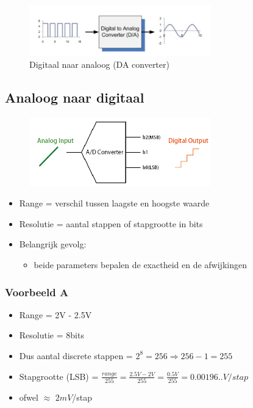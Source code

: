 \documentclass{article}
\begin{document}
\begin{figure}[H]
    \centering
    \includegraphics[width=0.7\textwidth]{Screenshot_20200224_115212.png}
    \caption{Digitaal naar analoog (DA converter)}
\end{figure}

\subsection{Analoog naar digitaal}

\begin{figure}[H]
    \centering
    \includegraphics[width=0.7\textwidth]{Screenshot_20200224_115430.jpg}
    \caption{}
\end{figure}

\begin{itemize}
    \item Range = verschil tussen laagste en hoogste waarde
    \item Resolutie = aantal stappen of stapgrootte in bits
    \item Belangrijk gevolg:
    \begin{itemize}
        \item beide parameters bepalen de exactheid en de afwijkingen
    \end{itemize}
\end{itemize}

\subsubsection{Voorbeeld A}
\begin{itemize}
    \item Range = 2V - 2.5V
    \item Resolutie = 8bits
    \item Dus aantal discrete stappen = $2^8 = 256 \Rightarrow 256 - 1 = 255$
    \item Stapgrootte (LSB) = $\frac{range}{255} = \frac{2.5V - 2V}{255} = \frac{0.5V}{255} = 0.00196..V / stap$
    \item ofwel $\approx$ $2mV$/stap
\end{itemize}
\end{document}
